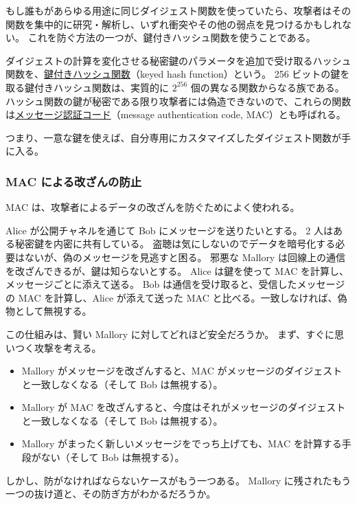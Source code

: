 \documentclass[uplatex]{jsarticle}
\def\label#1{}%
\begin{document}
もし誰もがあらゆる用途に同じダイジェスト関数を使っていたら、攻撃者はその関数を集中的に研究・解析し、いずれ衝突やその他の弱点を見つけるかもしれない。
これを防ぐ方法の一つが、鍵付きハッシュ関数を使うことである。

\begin{dfn}[鍵付きハッシュ関数とメッセージ認証コード]\label{dfn:ch5-mac}
ダイジェストの計算を変化させる秘密鍵のパラメータを追加で受け取るハッシュ関数を、\underline{鍵付きハッシュ関数}（keyed hash function）という。
256 ビットの鍵を取る鍵付きハッシュ関数は、実質的に $2^{256}$ 個の異なる関数からなる族である。
ハッシュ関数の鍵が秘密である限り攻撃者には偽造できないので、これらの関数は\underline{メッセージ認証コード}（message authentication code, MAC）とも呼ばれる。
\end{dfn}

つまり、一意な鍵を使えば、自分専用にカスタマイズしたダイジェスト関数が手に入る。

\subsubsection{MAC による改ざんの防止}

MAC は、攻撃者によるデータの改ざんを防ぐためによく使われる。

\begin{exa}\label{exa:ch5-alice-bob-mac}
Alice が公開チャネルを通じて Bob にメッセージを送りたいとする。
2 人はある秘密鍵を内密に共有している。
盗聴は気にしないのでデータを暗号化する必要はないが、偽のメッセージを見逃すと困る。
邪悪な Mallory は回線上の通信を改ざんできるが、鍵は知らないとする。
Alice は鍵を使って MAC を計算し、メッセージごとに添えて送る。
Bob は通信を受け取ると、受信したメッセージの MAC を計算し、Alice が添えて送った MAC と比べる。一致しなければ、偽物として無視する。
\end{exa}

この仕組みは、賢い Mallory に対してどれほど安全だろうか。
まず、すぐに思いつく攻撃を考える。
\begin{itemize}
\item Mallory がメッセージを改ざんすると、MAC がメッセージのダイジェストと一致しなくなる（そして Bob は無視する）。
\item Mallory が MAC を改ざんすると、今度はそれがメッセージのダイジェストと一致しなくなる（そして Bob は無視する）。
\item Mallory がまったく新しいメッセージをでっち上げても、MAC を計算する手段がない（そして Bob は無視する）。
\end{itemize}
しかし、防がなければならないケースがもう一つある。
Mallory に残されたもう一つの抜け道と、その防ぎ方がわかるだろうか。
\end{document}
